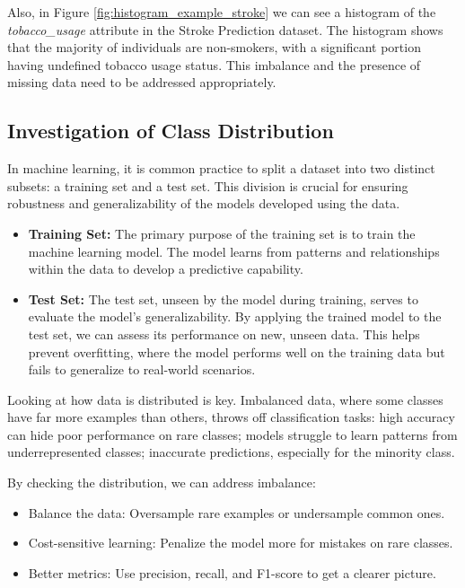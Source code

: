 \documentclass[runningheads]{paper}
\begin{document}
Also, in Figure \ref{fig:histogram_example_stroke} we can see a histogram of the
\textit{tobacco\_usage} attribute in the Stroke Prediction dataset. The histogram 
shows that the majority of individuals are non-smokers, with a significant portion 
having undefined tobacco usage status. This imbalance and the presence of missing 
data need to be addressed appropriately.

\subsection{Investigation of Class Distribution}
In machine learning, it is common practice to split a dataset into two distinct
subsets: a training set and a test set. This division is crucial for ensuring 
 robustness and generalizability of the models developed using the data.

\begin{itemize}
    \item \textbf{Training Set:} The primary purpose of the training set is to 
    train the machine 
    learning model. The model learns from patterns and relationships within the data 
    to develop a predictive capability.
    \item \textbf{Test Set:} The test set, unseen by the model during training, 
    serves to evaluate the model's generalizability. By applying the trained 
    model to the test set, we can assess its performance on new, unseen data. 
    This helps prevent overfitting, where the model performs well on the 
    training data but fails to generalize to real-world scenarios.
\end{itemize}

Looking at how data is distributed is key. Imbalanced data, where some classes 
have far more examples than others, throws off classification tasks:
high accuracy can hide poor performance on rare classes; models struggle to 
learn patterns from underrepresented classes; inaccurate predictions, especially 
for the minority class.

By checking the distribution, we can address imbalance:
\begin{itemize}
    \item Balance the data: Oversample rare examples or undersample common ones.
    \item Cost-sensitive learning: Penalize the model more for mistakes on rare classes.
    \item Better metrics: Use precision, recall, and F1-score to get a clearer picture.
\end{itemize}
\end{document}
